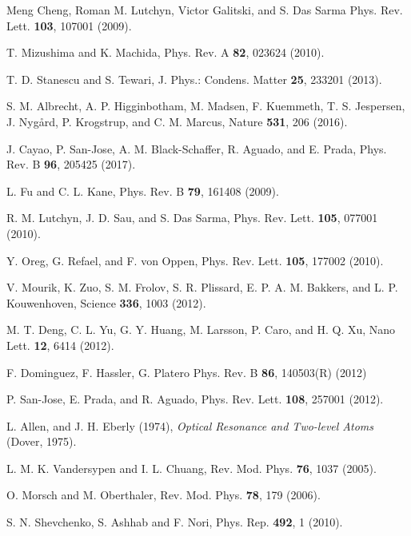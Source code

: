 \documentclass[aps,prl,twocolumn,showpacs,showpacs,10pt,superscriptaddress]{revtex4-1}
\begin{document}
\begin{thebibliography}{00}
 Meng Cheng, Roman M. Lutchyn, Victor Galitski, and S. Das Sarma Phys. Rev. Lett. \textbf{103}, 107001 (2009).

 T. Mizushima and K. Machida, Phys. Rev. A \textbf{82}, 023624 (2010).

 T. D. Stanescu and S. Tewari, J. Phys.: Condens. Matter \textbf{25}, 233201 (2013).

 S. M. Albrecht, A. P. Higginbotham, M. Madsen, F. Kuemmeth, T. S. Jespersen, J. Nyg{\aa}rd, P. Krogstrup, and C. M. Marcus, Nature \textbf{531}, 206 (2016).

 J. Cayao, P. San-Jose, A. M. Black-Schaffer, R. Aguado, and E. Prada, Phys. Rev. B \textbf{96}, 205425 (2017).

 L. Fu and C. L. Kane, Phys. Rev. B \textbf{79}, 161408 (2009).

 R. M. Lutchyn, J. D. Sau, and S. Das Sarma, Phys. Rev. Lett. \textbf{105}, 077001 (2010).

 Y. Oreg, G. Refael, and F. von Oppen, Phys. Rev. Lett. \textbf{105},
177002 (2010).

 V. Mourik, K. Zuo, S. M. Frolov, S. R. Plissard, E. P. A. M. Bakkers, and L. P. Kouwenhoven, Science \textbf{336}, 1003 (2012).

 M. T. Deng, C. L. Yu, G. Y. Huang, M. Larsson, P. Caro, and H. Q. Xu, Nano Lett. \textbf{12}, 6414 (2012).

 F. Dominguez, F. Hassler, G. Platero Phys. Rev. B \textbf{86}, 140503(R) (2012)

 P. San-Jose, E. Prada, and R. Aguado, Phys. Rev. Lett. \textbf{108}, 257001 (2012).

 L. Allen, and J. H. Eberly (1974), {\it Optical Resonance and Two-level Atoms} (Dover, 1975).

 L. M. K. Vandersypen and I. L. Chuang, Rev. Mod. Phys. \textbf{76}, 1037 (2005).

 O. Morsch and M. Oberthaler, Rev. Mod. Phys. \textbf{78}, 179 (2006).

 S. N. Shevchenko, S. Ashhab and F. Nori, Phys. Rep. \textbf{492}, 1 (2010).











\end{thebibliography}
\end{document}
